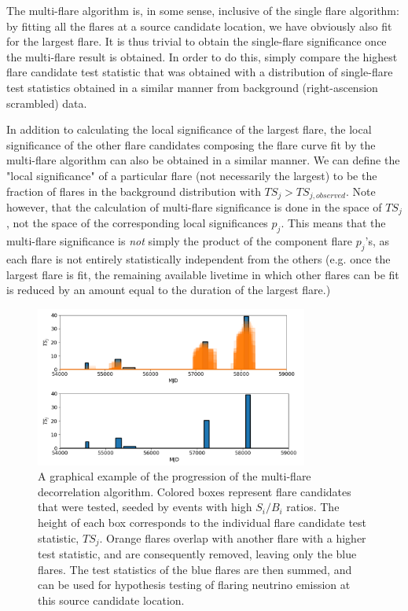 The multi-flare algorithm is, in some sense, inclusive of the single flare algorithm: by fitting all the flares at a source candidate location, we have obviously also fit for the largest flare. It is thus trivial to obtain the single-flare significance once the multi-flare result is obtained. In order to do this, simply compare the highest flare candidate test statistic that was obtained with a distribution of single-flare test statistics obtained in a similar manner from background (right-ascension scrambled) data. 

In addition to calculating the local significance of the largest flare, the local significance of the other flare candidates composing the flare curve fit by the multi-flare algorithm can also be obtained in a similar manner. We can define the "local significance" of a particular flare (not necessarily the largest) to be the fraction of flares in the background distribution with $TS_j>TS_{j,observed}$. Note however, that the calculation of multi-flare significance is done in the space of $TS_j$, not the space of the corresponding local significances $p_j$. This means that the multi-flare significance is \textit{not} simply the product of the component flare $p_j$'s, as each flare is not entirely statistically independent from the others (e.g. once the largest flare is fit, the remaining available livetime in which other flares can be fit is reduced by an amount equal to the duration of the largest flare.) 

\begin{figure}[h]
\centering
\includegraphics[width=0.8\textwidth]{figs/mf_algorithm.png}
\caption{A graphical example of the progression of the multi-flare decorrelation algorithm. Colored boxes represent flare candidates that were tested, seeded by events with high $S_i/B_i$ ratios. The height of each box corresponds to the individual flare candidate test statistic, $TS_j$. Orange flares overlap with another flare with a higher test statistic, and are consequently removed, leaving only the blue flares. The test statistics of the blue flares are then summed, and can be used for hypothesis testing of flaring neutrino emission at this source candidate location.}
\label{fig:mf_algorithm}
\end{figure}


